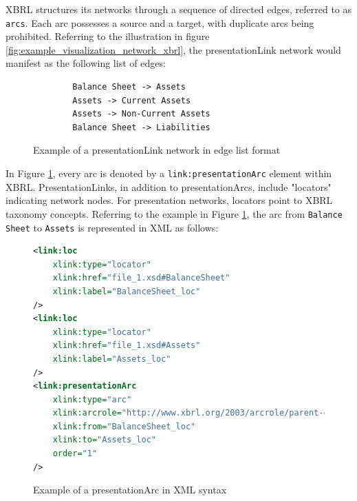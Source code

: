 XBRL structures its networks through a sequence of directed edges, referred to as \texttt{arcs}.
Each arc possesses a source and a target, with duplicate arcs being prohibited.
Referring to the illustration in figure \ref{fig:example_visualization_network_xbrl},
the presentationLink network would manifest as the following list of edges:

\begin{figure}[H]
    \begin{verbatim}
        Balance Sheet -> Assets
        Assets -> Current Assets
        Assets -> Non-Current Assets
        Balance Sheet -> Liabilities
    \end{verbatim}
    \caption{Example of a presentationLink network in edge list format}
    \label{fig:example_visualization_network_xbrl_edge_list}
\end{figure}


In Figure \ref{fig:example_visualization_network_xbrl_edge_list}, every arc is denoted by a \texttt{link:presentationArc} element within XBRL.
PresentationLinks, in addition to presentationArcs, include "locators" indicating network nodes.
For presentation networks, locators point to XBRL taxonomy concepts.
Referring to the example in Figure \ref{fig:example_visualization_network_xbrl_edge_list},
the arc from \texttt{Balance Sheet} to \texttt{Assets} is represented in XML as follows:

\begin{figure}[H]
    \centering
    \begin{lstlisting}[language=XML, basicstyle=\small\ttfamily]
<link:loc 
    xlink:type="locator" 
    xlink:href="file_1.xsd#BalanceSheet"
    xlink:label="BalanceSheet_loc"
/>
<link:loc 
    xlink:type="locator" 
    xlink:href="file_1.xsd#Assets"
    xlink:label="Assets_loc"
/>
<link:presentationArc 
    xlink:type="arc" 
    xlink:arcrole="http://www.xbrl.org/2003/arcrole/parent-child" 
    xlink:from="BalanceSheet_loc" 
    xlink:to="Assets_loc"
    order="1"
/>
\end{lstlisting}
    \caption{Example of a presentationArc in XML syntax}
    \label{fig:example_presentation_arc_xml}
\end{figure}

